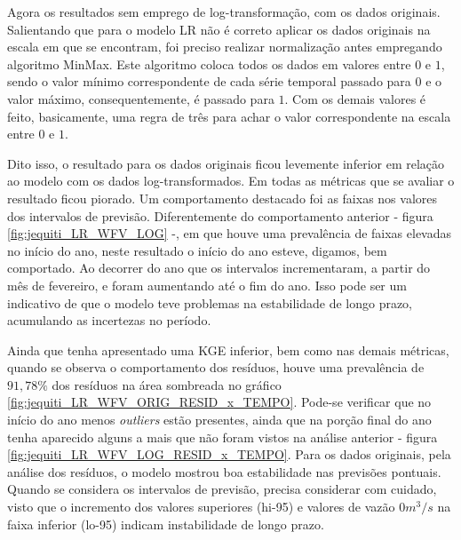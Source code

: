 Agora os resultados sem emprego de log-transformação, com os dados originais. Salientando que para o modelo LR não é correto aplicar os dados originais na escala em que se encontram, foi preciso realizar normalização antes empregando algoritmo MinMax. Este algoritmo coloca todos os dados em valores entre $0$ e $1$, sendo o valor mínimo correspondente de cada série temporal passado para $0$ e o valor máximo, consequentemente, é passado para $1$. Com os demais valores é feito, basicamente, uma regra de três para achar o valor correspondente na escala entre $0$ e $1$.

Dito isso, o resultado para os dados originais ficou levemente inferior em relação ao modelo com os dados log-transformados. Em todas as métricas que se avaliar o resultado ficou piorado. Um comportamento destacado foi as faixas nos valores dos intervalos de previsão. Diferentemente do comportamento anterior - figura \ref{fig:jequiti_LR_WFV_LOG} -, em que houve uma prevalência de faixas elevadas no início do ano, neste resultado o início do ano esteve, digamos, bem comportado. Ao decorrer do ano que os intervalos incrementaram, a partir do mês de fevereiro, e foram aumentando até o fim do ano. Isso pode ser um indicativo de que o modelo teve problemas na estabilidade de longo prazo, acumulando as incertezas no período.

Ainda que tenha apresentado uma KGE inferior, bem como nas demais métricas, quando se observa o comportamento dos resíduos, houve uma prevalência de $91,78\%$ dos resíduos na área sombreada no gráfico \ref{fig:jequiti_LR_WFV_ORIG_RESID_x_TEMPO}. Pode-se verificar que no início do ano menos \textit{outliers} estão presentes, ainda que na porção final do ano tenha aparecido alguns a mais que não foram vistos na análise anterior - figura \ref{fig:jequiti_LR_WFV_LOG_RESID_x_TEMPO}. Para os dados originais, pela análise dos resíduos, o modelo mostrou boa estabilidade nas previsões pontuais. Quando se considera os intervalos de previsão, precisa considerar com cuidado, visto que o incremento dos valores superiores (hi-95) e valores de vazão $0 m^3/s$ na faixa inferior (lo-95) indicam instabilidade de longo prazo.

